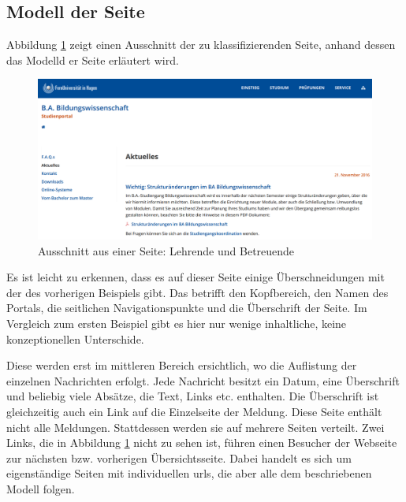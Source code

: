 \subsection{Modell der Seite}
    Abbildung \ref{image:findingNewsModelOverview} zeigt einen
    Ausschnitt der zu klassifizierenden Seite,
    anhand dessen das Modelld er Seite erläutert wird.

    \begin{figure}[htb]
        \centering
        \includegraphics[width=\textwidth]{../resources/findings/case-study-2/news-overview.png}
        \caption{Ausschnitt aus einer Seite: Lehrende und Betreuende}
        \label{image:findingNewsModelOverview}
    \end{figure}

    Es ist leicht zu erkennen, dass es auf dieser Seite einige Überschneidungen
    mit der des vorherigen Beispiels gibt.
    Das betrifft den Kopfbereich, den Namen des Portals,
    die seitlichen Navigationspunkte und die Überschrift der Seite.
    Im Vergleich zum ersten Beispiel gibt es hier nur wenige inhaltliche,
    keine konzeptionellen Unterschide.

    Diese werden erst im mittleren Bereich ersichtlich,
    wo die Auflistung der einzelnen Nachrichten erfolgt.
    Jede Nachricht besitzt ein Datum, eine Überschrift und beliebig viele Absätze,
    die Text, Links etc. enthalten.
    Die Überschrift ist gleichzeitig auch ein Link auf die Einzelseite der Meldung.
    Diese Seite enthält nicht alle Meldungen.
    Stattdessen werden sie auf mehrere Seiten verteilt.
    Zwei Links, die in Abbildung \ref{image:findingNewsModelOverview} nicht zu sehen ist,
    führen einen Besucher der Webseite zur nächsten bzw. vorherigen Übersichtsseite.
    Dabei handelt es sich um eigenständige Seiten mit individuellen \glspl{url},
    die aber alle dem beschriebenen Modell folgen.

